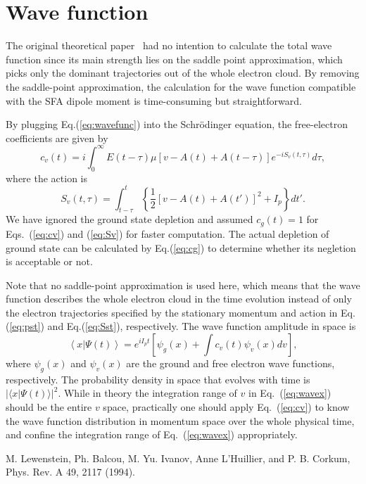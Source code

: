\documentclass[aps,prl,twocolumn,nofootinbib,letterpaper]{revtex4}
\begin{document}
\section{Wave function}

The original theoretical paper~\cite{lewenstein} had no intention to calculate the total wave function since its main strength lies on the saddle point approximation, which picks only the dominant trajectories out of the whole electron cloud. By removing the saddle-point approximation, the calculation for the wave function compatible with the SFA dipole moment is time-consuming but straightforward.

By plugging Eq.(\ref{eq:wavefunc}) into the Schr{\"o}dinger equation, the free-electron coefficients are given by
\begin{equation}
c_v(t) = i\int_{0}^{\infty} {E(t-\tau)\mu[v-A(t)+A(t-\tau)] e^{-iS_v(t,\tau)}d\tau}, \label{eq:cv}
\end{equation}
where the action is
\begin{equation}
S_v(t,\tau) = \int_{t-\tau}^{t} {\left\{ \frac{1}{2} \left[ v-A(t)+A(t') \right]^2 + I_p \right\} dt'}. \label{eq:Sv}
\end{equation}
We have ignored the ground state depletion and assumed $c_g(t)=1$ for Eqs.~(\ref{eq:cv}) and (\ref{eq:Sv}) for faster computation. The actual depletion of ground state can be calculated by Eq.(\ref{eq:cg}) to determine whether its negletion is acceptable or not.

Note that no saddle-point approximation is used here, which means that the wave function describes the whole electron cloud in the time evolution instead of only the electron trajectories specified by the stationary momentum and action in Eq.(\ref{eq:pst}) and Eq.(\ref{eq:Sst}), respectively. The wave function amplitude in space is
\begin{equation}
\left\langle x|\Psi(t) \right\rangle = e^{iI_pt} \left[ \psi_g(x) + \int{c_v(t)\psi_v(x)dv} \right], \label{eq:wavex}
\end{equation}
where $\psi_g(x)$ and $\psi_v(x)$ are the ground and free electron wave functions, respectively. The probability density in space that evolves with time is $|\langle x| \Psi(t) \rangle|^2$. While in theory the integration range of $v$ in Eq.~(\ref{eq:wavex}) should be the entire $v$ space, practically one should apply Eq.~(\ref{eq:cv}) to know the wave function distribution in momentum space over the whole physical time, and confine the integration range of Eq.~(\ref{eq:wavex}) appropriately.

\begin{thebibliography}{}
 M. Lewenstein, Ph. Balcou, M. Yu. Ivanov, Anne L’Huillier, and P. B. Corkum, Phys. Rev. A 49, 2117 (1994).
\end{thebibliography}
\end{document}
